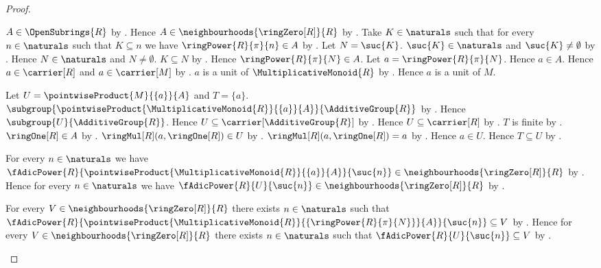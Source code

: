 \begin{proof}
\begin{subproof}
        $A\in\OpenSubrings{R}$ by .
        Hence $A\in\neighbourhoods{\ringZero[R]}{R}$ by
            .
        Take $K\in\naturals$ such that for every $n\in\naturals$ such
            that $K\subseteq n$ we have $\ringPower{R}{\pi}{n}\in A$ by
            .
        Let $N=\suc{K}$.
        $\suc{K}\in\naturals$ and $\suc{K}\neq\emptyset$ by
            .
        Hence $N\in\naturals$ and $N\neq\emptyset$.
        $K\subseteq N$ by .
        Hence $\ringPower{R}{\pi}{N}\in A$.
        Let $a=\ringPower{R}{\pi}{N}$.
        Hence $a\in A$.
        Hence $a\in\carrier[R]$ and $a\in\carrier[M]$ by
            .
        $a$ is a unit of $\MultiplicativeMonoid{R}$ by
            .
        Hence $a$ is a unit of $M$.

        Let $U=\pointwiseProduct{M}{\{a\}}{A}$ and $T=\{a\}$.
        $\subgroup{
            \pointwiseProduct{\MultiplicativeMonoid{R}}{\{a\}}{A}}{
            \AdditiveGroup{R}}$ by
            .
        Hence $\subgroup{U}{\AdditiveGroup{R}}$.
        Hence $U\subseteq\carrier[\AdditiveGroup{R}]$ by
            .
        Hence $U\subseteq\carrier[R]$ by
            .
        $T$ is finite by .
        $\ringOne[R]\in A$ by .
        $\ringMul[R](a,\ringOne[R])\in U$ by
            .
        $\ringMul[R](a,\ringOne[R])=a$ by
            .
        Hence $a\in U$.
        Hence $T\subseteq U$ by .

        For every $n\in\naturals$ we have
            $\fAdicPower{R}{
                \pointwiseProduct{\MultiplicativeMonoid{R}}{\{a\}}{A}}{
                \suc{n}}\in\neighbourhoods{\ringZero[R]}{R}$ by
            .
        Hence for every $n\in\naturals$ we have
            $\fAdicPower{R}{U}{\suc{n}}
                \in\neighbourhoods{\ringZero[R]}{R}$ by \auto.

        For every $V\in\neighbourhoods{\ringZero[R]}{R}$ there exists
            $n\in\naturals$ such that
            $\fAdicPower{R}{
                \pointwiseProduct{\MultiplicativeMonoid{R}}{
                    \{\ringPower{R}{\pi}{N}\}}{A}}{\suc{n}}\subseteq V$ by
            .
        Hence for every $V\in\neighbourhoods{\ringZero[R]}{R}$ there
            exists $n\in\naturals$ such that
                $\fAdicPower{R}{U}{\suc{n}}\subseteq V$ by \auto.


\end{subproof}
\end{proof}
